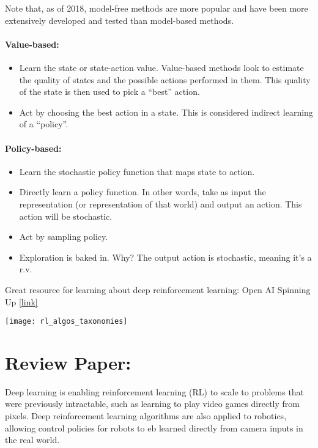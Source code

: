 Note that, as of 2018, model-free methods are more popular and have been more extensively developed and tested than model-based methods.


\paragraph*{Value-based: } 
\begin{itemize}
	\item Learn the state or state-action value. Value-based methods look to estimate the quality of states and the possible actions performed in them. This quality of the state is then used to pick a ``best'' action. 
	\item Act by choosing the best action in a state. This is considered indirect learning of a ``policy''.
\end{itemize}  

\paragraph*{Policy-based: }
\begin{itemize}
	\item Learn the stochastic policy function that maps state to action.
	\item Directly learn a policy function. In other words, take as input the representation (or representation of that world) and output an action. This action will be stochastic. 
	\item Act by sampling policy. 
	\item Exploration is baked in. Why? The output action is stochastic, meaning it's a r.v. 
\end{itemize}


Great resource for learning about deep reinforcement learning: Open AI Spinning Up \href{https://spinningup.openai.com/en/latest/user/introduction.html}{[link]}





\texttt{[image: rl\_algos\_taxonomies]}

\section{Review Paper: }

\cite{arulkumaran2017deep}

Deep learning is enabling reinforcement learning (RL) to scale to problems that were previously intractable, such as learning to play video games directly from pixels.  Deep reinforcement learning algorithms are also applied to robotics, allowing control policies for robots to eb learned directly from camera inputs in the real world. 
